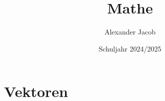 \documentclass{ajc}
\title{Mathe}
\author{Alexander Jacob}
\date{Schuljahr 2024/2025}
\begin{document}
	\section{Vektoren}
\end{document}
